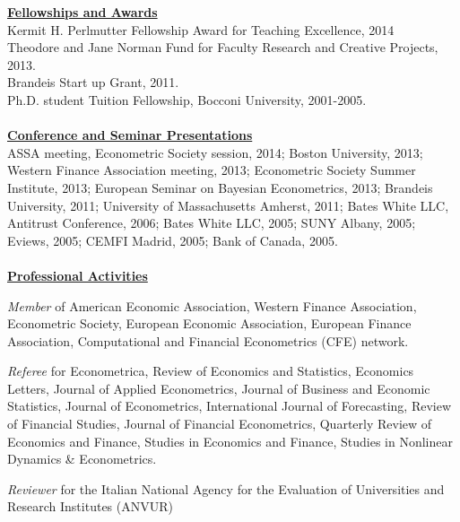 \documentclass[12pt]{article}
\begin{document}
\underline{\textbf{Fellowships and Awards}}\\
Kermit H. Perlmutter Fellowship Award for Teaching Excellence, 2014 \\
Theodore and Jane Norman Fund for Faculty Research and Creative Projects, 2013. \\
Brandeis Start up Grant, 2011. \\
Ph.D. student Tuition Fellowship, Bocconi University, 2001-2005.\\ \\
\underline{\textbf{Conference and Seminar Presentations}}\\
ASSA meeting, Econometric Society session, 2014; Boston University, 2013; Western Finance Association meeting, 2013; Econometric Society Summer Institute, 2013; European Seminar on Bayesian Econometrics, 2013; Brandeis University, 2011; University of Massachusetts Amherst, 2011; Bates White LLC, Antitrust Conference, 2006; Bates White LLC, 2005; SUNY Albany, 2005; Eviews, 2005; CEMFI Madrid, 2005; Bank of Canada, 2005.\\ \\
\underline{\textbf{Professional Activities}}
\begin{description}
\item\emph{Member} of American Economic Association, Western Finance Association, Econometric Society, European Economic Association, European Finance Association, Computational and Financial Econometrics (CFE) network.

\item \emph{Referee} for Econometrica, Review of Economics and Statistics, Economics Letters, Journal of Applied Econometrics, Journal of Business and Economic Statistics, Journal of Econometrics, International Journal of Forecasting, Review of Financial Studies, Journal of Financial Econometrics, Quarterly Review of Economics and Finance, Studies in Economics and Finance, Studies in Nonlinear Dynamics & Econometrics.

\item \emph{Reviewer} for the Italian National Agency for the Evaluation of Universities and Research Institutes (ANVUR) 
\end{description}
 
\end{document}
